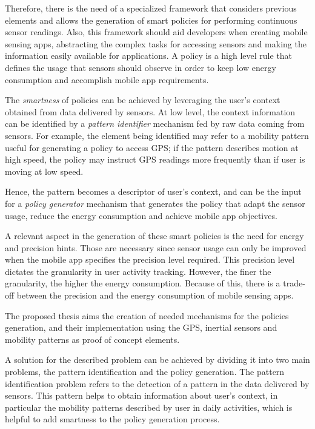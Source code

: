 Therefore, there is the need of a specialized framework that considers previous elements and allows the generation of smart policies for performing continuous sensor readings.
Also, this framework should aid developers when creating mobile sensing apps, abstracting the complex tasks for accessing sensors and making the information easily available for applications.
A policy is a high level rule that defines the usage that sensors should observe in order to keep low energy consumption and accomplish mobile app requirements.


The \emph{smartness} of policies can be achieved by leveraging the user’s context obtained from data delivered by sensors.
At low level, the context information can be identified by a \emph{pattern identifier} mechanism fed by raw data coming from sensors.
For example, the element being identified may refer to a mobility pattern useful for generating a policy to access GPS; if the pattern describes motion at high speed, the policy may instruct GPS readings more frequently than if user is moving at low speed.



Hence, the pattern becomes a descriptor of user's context, and can be the input for a \emph{policy generator} mechanism that generates the policy that adapt the sensor usage, reduce the energy consumption and achieve mobile app objectives.


A relevant aspect in the generation of these smart policies is the need for energy and precision hints.
Those are necessary since sensor usage can only be improved when the mobile app specifies the precision level required.
This precision level dictates the granularity in user activity tracking.
However, the finer the granularity, the higher the energy consumption. 
Because of this, there is a trade-off between the precision and the energy consumption of mobile sensing apps.

The proposed thesis aims the creation of needed mechanisms for the policies generation, and their implementation using the GPS, inertial sensors and mobility patterns as proof of concept elements.

A solution for the described problem can be achieved by dividing it into two main problems, the pattern identification and the policy generation.
The pattern identification problem refers to the detection of a pattern in the data delivered by sensors.
This pattern helps to obtain information about user's context, in particular the mobility patterns described by user in daily activities, which is helpful to add smartness to the policy generation process.

